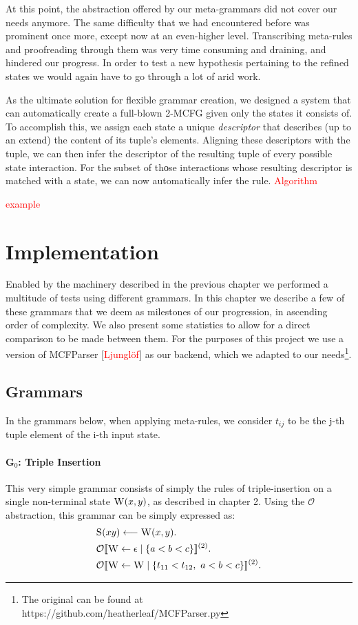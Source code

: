 \documentclass[nonatbib,numbers,10pt]{sigplanconf}
\newcommand\todo[1]{\textcolor{red}{#1}}
\newcommand\s{\textsc}
\newcommand{\Orderr}[5]{
	\mathcal{#1}\llbracket #2 \leftarrow #3 \mid \{ #4 \} \rrbracket^{(#5)}.
}
\newcommand{\Or}[4]{\Orderr{O}{#1}{#2}{#3}{#4}}
\begin{document}
At this point, the abstraction offered by our meta-grammars did not cover our needs anymore. The same difficulty that we had encountered before was prominent once more, except now at an even-higher level. Transcribing meta-rules and proofreading through them was very time consuming and draining, and hindered our progress. In order to test a new hypothesis pertaining to the refined states we would again have to go through a lot of arid work.

As the ultimate solution for flexible grammar creation, we designed a system that can automatically create a full-blown 2-MCFG given only the states it consists of. To accomplish this, we assign each state a unique \textit{descriptor} that describes (up to an extend) the content of its tuple's elements. Aligning these descriptors with the tuple, we can then infer the descriptor of the resulting tuple of every possible state interaction. For the subset of thοse interactions whose resulting descriptor is matched with a state, we can now automatically infer the rule.
\todo{Algorithm}

\todo{example}

\section{Implementation}
Enabled by the machinery described in the previous chapter we performed a multitude of tests using different grammars. In this chapter we describe a few of these grammars that we deem as milestones of our progression, in ascending order of complexity. We also present some statistics to allow for a direct comparison to be made between them. For the purposes of this project we use a version of MCFParser [\todo{Ljunglöf}] as our backend, which we adapted to our needs\footnote{The original can be found at https://github.com/heatherleaf/MCFParser.py}.
\subsection{Grammars}
In the grammars below, when applying meta-rules, we consider $t_{ij}$ to be the j-th tuple element of the i-th input state.
\paragraph{G$_0$: Triple Insertion}
This very simple grammar consists of simply the rules of triple-insertion on a single non-terminal state $\s{W}(x,y)$, as described in chapter 2. Using the $\mathcal{O}$ abstraction, this grammar can be simply expressed as:
\begin{align*}
&\s{S}(xy) \longleftarrow \s{W}(x,y). \\
&\Or{\s{W}}{\epsilon}{a < b < c}{2} \\
&\Or{\s{W}}{\s{W}}{t_{11} < t_{12},\ a < b < c}{2}
\end{align*}
\end{document}
